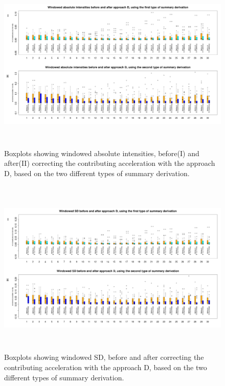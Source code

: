 \documentclass{article}
\begin{document}
{\begin{figure}[h!]
\includegraphics[width=15cm, height=8.5cm]{result_approach_D_AI_boxplot.png}
\caption{Boxplots showing windowed absolute intensities, before(I) and after(II) correcting the contributing acceleration with the approach D, based on the two different types of summary derivation.}
\end{figure}
\newpage
\begin{figure}[h!]
\includegraphics[width=15cm, height=8.5cm]{result_approach_D_SD_boxplot.png}
\caption{Boxplots showing windowed SD, before and after correcting the contributing acceleration with the approach D, based on the two different types of summary derivation.}
\end{figure}

}
\end{document}
